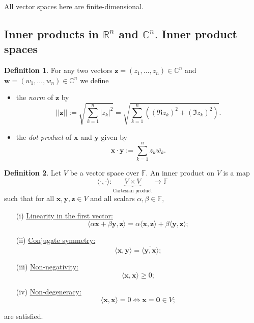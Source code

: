\documentclass[12pt, a4paper]{article}
\newcommand{\bb}[1]{\mathbb{#1}}
\theoremstyle{definition}
\newtheorem{definition}{Definition}[section]
\theoremstyle{plain}
\begin{document}
All vector spaces here are finite-dimensional.

\subsection{Inner products in \texorpdfstring{$\bb{R}^n$}{TEXT} and \texorpdfstring{$\bb{C}^n.$}{TEXT} Inner product spaces}

\begin{definition}
For any two vectors $\mathbf{z}=(z_1,\ldots,z_n) \in \bb{C}^n$ and $\mathbf{w} = (w_1,\ldots,w_n) \in \bb{C}^n$ we define \begin{itemize}

	\item the \textit{norm} of $\mathbf{z}$ by $$||\mathbf{z}||:= \sqrt{\sum_{k=1}^{n} |z_k|^2} = \sqrt{\sum_{k=1}^{n} \left(\left(\Re{z_k}\right)^2+\left(\Im{z_k}\right)^2\right)}.$$

    \item the \textit{dot product} of $\mathbf{x}$ and $\mathbf{y}$ given by $$\mathbf{x\cdot y}:=\sum_{k=1}^{n}z_k\overline{w_k}.$$

\end{itemize}
\end{definition}

\begin{definition}
 Let $V$ be a vector space over $\bb{F}.$ An inner product on $V$ is a map $$\langle \cdot,\cdot\rangle: \underbrace{V\times V}_{\text{Cartesian product}} \to \bb{F}$$ such that for all $\mathbf{x,y,z} \in V$ and all scalars $\alpha, \beta \in \bb{F},$
 \begin{enumerate}
 	
 	\item[(i)] \underline{Linearity in the first vector:} $$\langle \alpha\mathbf{x}+\beta\mathbf{y},\mathbf{z}\rangle=\alpha\langle\mathbf{x,z}\rangle +\beta\langle\mathbf{y,z}\rangle;$$

 	\item[(ii)] \underline{Conjugate symmetry:} $$\langle  \mathbf{x,y}\rangle=\overline{\langle \mathbf{y,x} \rangle};$$

 	\item[(iii)]\underline{Non-negativity:} $$\langle \mathbf{x,x}\rangle\geq 0 ;$$

 	\item[(iv)]\underline{Non-degeneracy:} $$\langle \mathbf{x,x} \rangle=0  \iff \mathbf{x=0} \in V;$$
 \end{enumerate}
are satisfied.
\end{definition}
\end{document}
